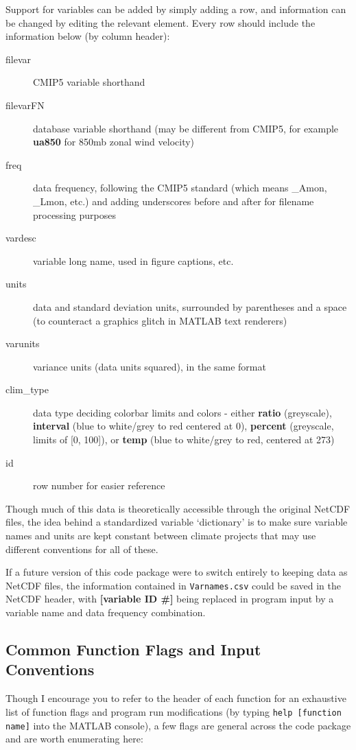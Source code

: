 \documentclass{article}
\begin{document}
Support for variables can be added by simply adding a row, and information can be changed by editing the relevant element. Every row should include the information below (by column header):\begin{description}
\item [filevar] CMIP5 variable shorthand
\item [filevarFN] database variable shorthand (may be different from CMIP5, for example \textbf{ua850} for 850mb zonal wind velocity)
\item [freq] data frequency, following the CMIP5 standard (which means \_Amon, \_Lmon, etc.) and adding underscores before and after for filename processing purposes
\item [vardesc] variable long name, used in figure captions, etc.
\item [units] data and standard deviation units, surrounded by parentheses and a space (to counteract a graphics glitch in MATLAB text renderers)
\item [varunits] variance units (data units squared), in the same format
\item [clim\_type] data type deciding colorbar limits and colors - either \textbf{ratio} (greyscale), \textbf{interval} (blue to white/grey to red centered at 0), \textbf{percent} (greyscale, limits of [0, 100]), or \textbf{temp} (blue to white/grey to red, centered at 273)
\item [id] row number for easier reference
\end{description}

Though much of this data is theoretically accessible through the original NetCDF files, the idea behind a standardized variable `dictionary' is to make sure variable names and units are kept constant between climate projects that may use different conventions for all of these.

If a future version of this code package were to switch entirely to keeping data as NetCDF files, the information contained in \texttt{Varnames.csv} could be saved in the NetCDF header, with \textbf{[variable ID \#]} being replaced in program input by a variable name and data frequency combination. 

\subsection{Common Function Flags and Input Conventions}
Though I encourage you to refer to the header of each function for an exhaustive list of function flags and program run modifications (by typing \texttt{help [function name]} into the MATLAB console), a few flags are general across the code package and are worth enumerating here:
\end{document}
